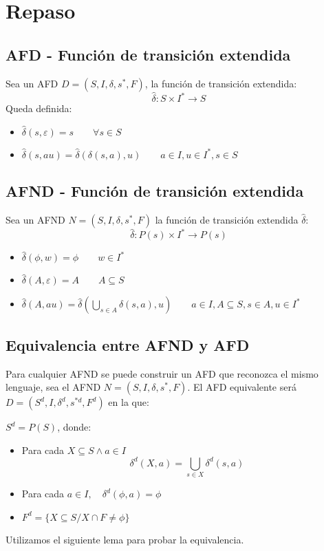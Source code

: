 \chapter{Repaso}
\section{AFD - Función de transición extendida}
Sea un AFD $D=(S,I,\delta,s^*,F)$, la función de transición extendida:
$$\widehat{\delta}:S\times I^*\rightarrow S$$
Queda definida:
\begin{itemize}
\item $\widehat{\delta}(s,\varepsilon)=s\qquad \forall s\in S$
\item $\widehat{\delta}(s,au)=\widehat{\delta}(\delta(s,a),u)\qquad a\in I,u\in I^*, s\in S$
\end{itemize}
\section{AFND - Función de transición extendida}
Sea un AFND $N=(S,I,\delta,s^*,F)$ la función de transición extendida $\widehat{\delta}$:
$$\widehat{\delta}:P(s)\times I^*\rightarrow P(s)$$
\begin{itemize}
\item $\widehat{\delta}(\phi,w)=\phi	\qquad w\in I^*$
\item $\widehat{\delta}(A,\varepsilon)=A	\qquad A\subseteq S$
\item $\widehat{\delta}(A,au)=\widehat{\delta}(\bigcup_{s\in A}\delta(s,a),u)\qquad a\in I, A\subseteq S, s\in A, u\in I^*$
\end{itemize}
\section{Equivalencia entre AFND y AFD}
Para cualquier AFND se puede construir un AFD que reconozca el mismo lenguaje, sea el AFND $N=(S,I,\delta,s^*,F)$. El AFD equivalente será $D=(S^d,I,\delta^d,s^{*d},F^d)$ en la que:

$S^d=P(S)$, donde:
\begin{itemize}
\item Para cada $X\subseteq S \land a\in I$
$$\delta^d(X,a)=\bigcup_{s\in X}\delta^d(s,a)$$
\item Para cada $a\in I, \quad \delta^d(\phi,a)=\phi$
\item $F^d=\{X\subseteq S/X\cap F\not=\phi\}$
\end{itemize}
Utilizamos el siguiente lema para probar la equivalencia.

